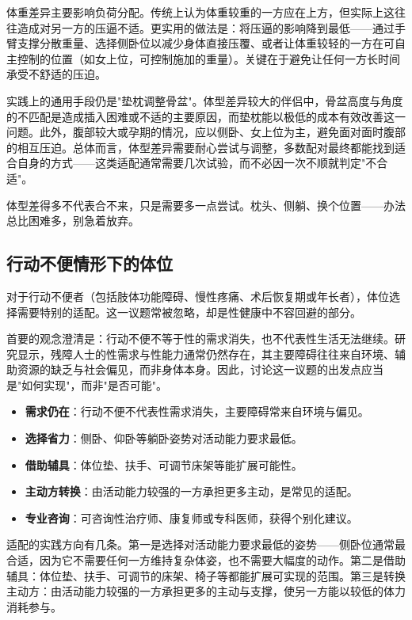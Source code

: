 \documentclass[12pt,UTF8]{ctexbook}
\newcommand{\keyword}[1]{\textbf{#1}}
\begin{document}
体重差异主要影响负荷分配。传统上认为体重较重的一方应在上方，但实际上这往往造成对另一方的压逼不适。更实用的做法是：将压逼的影响降到最低——通过手臂支撑分散重量、选择侧卧位以减少身体直接压覆、或者让体重较轻的一方在可自主控制的位置（如女上位，可控制施加的重量）。关键在于避免让任何一方长时间承受不舒适的压迫。

实践上的通用手段仍是"垫枕调整骨盆"。体型差异较大的伴侣中，骨盆高度与角度的不匹配是造成插入困难或不适的主要原因，而垫枕能以极低的成本有效改善这一问题。此外，腹部较大或孕期的情况，应以侧卧、女上位为主，避免面对面时腹部的相互压迫。总体而言，体型差异需要耐心尝试与调整，多数配对最终都能找到适合自身的方式——这类适配通常需要几次试验，而不必因一次不顺就判定"不合适"。

\begin{tcolorbox}[colback=pink!5!white,colframe=red!50!black,title=贴心小叮咛]
体型差得多不代表合不来，只是需要多一点尝试。枕头、侧躺、换个位置——办法总比困难多，别急着放弃。
\end{tcolorbox}
\subsection{行动不便情形下的体位}

对于行动不便者（包括肢体功能障碍、慢性疼痛、术后恢复期或年长者），体位选择需要特别的适配。这一议题常被忽略，却是性健康中不容回避的部分。

首要的观念澄清是：行动不便不等于性的需求消失，也不代表性生活无法继续。研究显示，残障人士的性需求与性能力通常仍然存在，其主要障碍往往来自环境、辅助资源的缺乏与社会偏见，而非身体本身。因此，讨论这一议题的出发点应当是"如何实现"，而非"是否可能"。

\begin{itemize}
  \item \keyword{需求仍在}：行动不便不代表性需求消失，主要障碍常来自环境与偏见。
  \item \keyword{选择省力}：侧卧、仰卧等躺卧姿势对活动能力要求最低。
  \item \keyword{借助辅具}：体位垫、扶手、可调节床架等能扩展可能性。
  \item \keyword{主动方转换}：由活动能力较强的一方承担更多主动，是常见的适配。
  \item \keyword{专业咨询}：可咨询性治疗师、康复师或专科医师，获得个别化建议。
\end{itemize}

适配的实践方向有几条。第一是选择对活动能力要求最低的姿势——侧卧位通常最合适，因为它不需要任何一方维持复杂体姿，也不需要大幅度的动作。第二是借助辅具：体位垫、扶手、可调节的床架、椅子等都能扩展可实现的范围。第三是转换主动方：由活动能力较强的一方承担更多的主动与支撑，使另一方能以较低的体力消耗参与。
\end{document}

